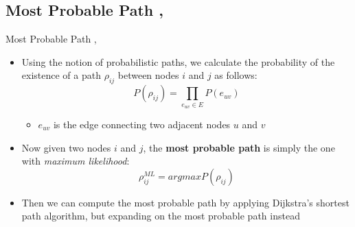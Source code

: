 \documentclass[9pt]{beamer}
\begin{document}
\subsection{Most Probable Path \cite{pfeiffer2010probabilistic}, \cite{pfeiffer2011methods}}
\begin{frame}{Most Probable Path \cite{pfeiffer2010probabilistic}, \cite{pfeiffer2011methods}}
\begin{itemize}
\item Using the notion of probabilistic paths, we calculate the probability of the existence of a path $\rho_{ij}$ between nodes $i$ and $j$ as follows:
\begin{equation*}
P(\rho_{ij}) = \prod_{e_{uv} \in E}P(e_{uv})
\end{equation*}
\vspace{-0.12in}
\begin{itemize}
\item $e_{uv}$ is the edge connecting two adjacent nodes $u$ and $v$
\end{itemize}
\item Now given two nodes $i$ and $j$, the \textbf{most probable path} is simply the one with \textit{maximum likelihood}:
\[ \rho_{ij}^{ML} = argmaxP(\rho_{ij}) \]
\item Then we can compute the most probable path by applying Dijkstra's shortest path algorithm, but expanding on the most probable path instead
\end{itemize}
\end{frame}




\end{document}
